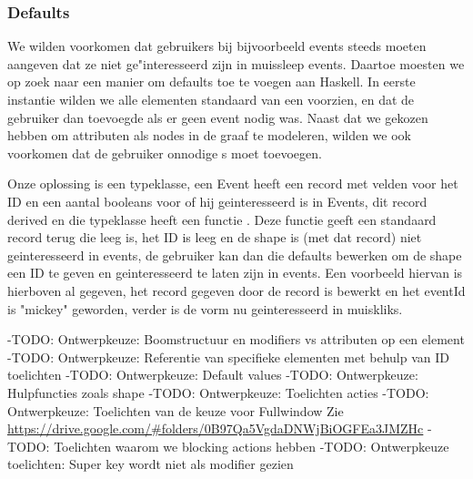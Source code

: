 \subsubsection{Defaults}
We wilden voorkomen dat gebruikers bij bijvoorbeeld events steeds moeten aangeven dat ze niet ge"interesseerd zijn in muissleep events. Daartoe moesten we op zoek naar een manier om defaults toe te voegen aan Haskell. In eerste instantie wilden we alle elementen standaard van een  voorzien, en dat de gebruiker dan  toevoegde als er geen event nodig was. Naast dat we gekozen hebben om attributen als nodes in de graaf te modeleren, wilden we ook voorkomen dat de gebruiker onnodige s moet toevoegen.

Onze oplossing is een  typeklasse, een Event heeft een record met velden voor het ID en een aantal booleans voor of hij geinteresseerd is in Events, dit record derived  en die typeklasse heeft een functie . Deze functie geeft een standaard record terug die leeg is, het ID is leeg en de shape is (met dat record) niet geinteresseerd in events, de gebruiker kan dan die defaults bewerken om de shape een ID te geven en geinteresseerd te laten zijn in events. Een voorbeeld hiervan is hierboven al gegeven, het record gegeven door de  record is bewerkt en het eventId is "mickey" geworden, verder is de vorm nu geinteresseerd in muiskliks.

-TODO: Ontwerpkeuze: Boomstructuur en modifiers vs attributen op een element
-TODO: Ontwerpkeuze: Referentie van specifieke elementen met behulp van ID toelichten
-TODO: Ontwerpkeuze: Default values
-TODO: Ontwerpkeuze: Hulpfuncties zoals shape
-TODO: Ontwerpkeuze: Toelichten acties
-TODO: Ontwerpkeuze: Toelichten van de keuze voor Fullwindow Zie \url{https://drive.google.com/#folders/0B97Qa5VgdaDNWjBiOGFEa3JMZHc}
-TODO: Toelichten waarom we blocking actions hebben
-TODO: Ontwerpkeuze toelichten: Super key wordt niet als modifier gezien
